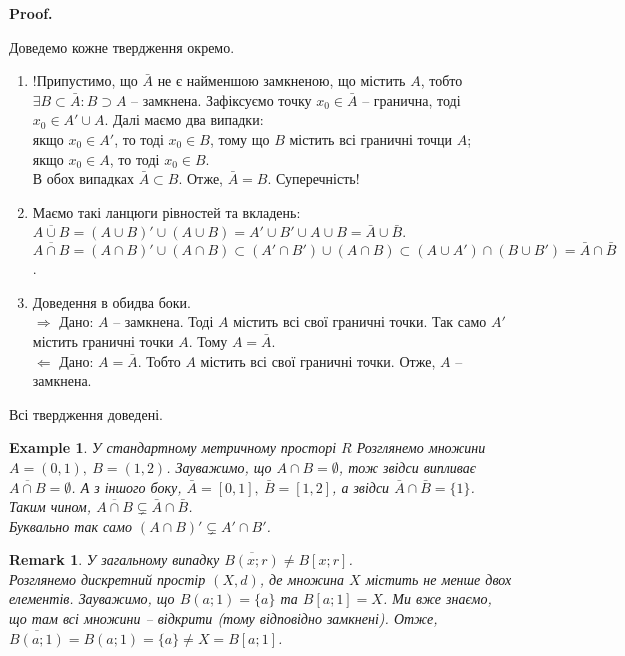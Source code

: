 \documentclass[a4paper, 10pt]{article}
\makeatletter
\def\rightproof{$\boxed{\Rightarrow}$ }
\def\leftproof{$\boxed{\Leftarrow}$ }
\theoremstyle{theoremdd}
\theoremstyle{theoremdd}
\theoremstyle{theoremdd}
\theoremstyle{theoremdd}
\newtheorem{example}[theorem]{Example}
\theoremstyle{theoremdd}
\theoremstyle{theoremdd}
\newtheorem{remark}[theorem]{Remark}
\theoremstyle{theoremdd}
\theoremstyle{theoremdd}
\renewenvironment{proof}[1][Proof.\\]{\par
\pushQED{\hfill \qed}%
\normalfont \topsep6\p@\@plus6\p@\relax
\trivlist
\item\relax
{\bfseries
#1\@addpunct{.}}\hspace\labelsep\ignorespaces
}{%
\popQED\endtrivlist\@endpefalse
}
\makeatother
\begin{document}
\begin{proof}
Доведемо кожне твердження окремо.
\begin{enumerate}[wide=0pt, label={\arabic*)}]
\item !Припустимо, що $\bar{A}$ не є найменшою замкненою, що містить $A$, тобто $\exists B \subset \bar{A}: B \supset A$ -- замкнена. Зафіксуємо точку $x_0 \in \bar{A}$ -- гранична, тоді $x_0 \in A' \cup A$. Далі маємо два випадки:\\
якщо $x_0 \in A'$, то тоді $x_0 \in B$, тому що $B$ містить всі граничні точци $A$;\\
якщо $x_0 \in A$, то тоді $x_0 \in B$.\\
В обох випадках $\bar{A} \subset B$. Отже, $\bar{A} = B$. Суперечність!

\item Маємо такі ланцюги рівностей та вкладень:\\
$\overline{A \cup B} = (A \cup B)' \cup (A \cup B) = A' \cup B' \cup A \cup B = \bar{A} \cup \bar{B}$.\\
$\overline{A \cap B} = (A \cap B)' \cup (A \cap B) \subset (A' \cap B') \cup (A \cap B) \subset (A \cup A') \cap (B \cup B') = \bar{A} \cap \bar{B}$.

\item Доведення в обидва боки.\\
\rightproof Дано: $A$ -- замкнена. Тоді $A$ містить всі свої граничні точки. Так само $A'$ містить граничні точки $A$. Тому $A = \bar{A}$.\\
\leftproof Дано: $A = \bar{A}$. Тобто $A$ містить всі свої граничні точки. Отже, $A$ -- замкнена.
\end{enumerate}
Всі твердження доведені.
\end{proof}

\begin{example}
У стандартному метричному просторі $R$ Розглянемо множини $A = (0,1),\ B = (1,2)$. Зауважимо, що $A \cap B = \emptyset$, тож звідси випливає $\overline{A \cap B} = \emptyset$. А з іншого боку, $\bar{A} = [0,1],\ \bar{B} = [1,2]$, а звідси $\bar{A} \cap \bar{B} = \{1\}$.\\
Таким чином, $\overline{A \cap B} \subsetneq \bar{A} \cap \bar{B}$.\\
Буквально так само $(A \cap B)' \subsetneq A' \cap B'$.
\end{example}

\begin{remark}
У загальному випадку $\overline{B(x;r)} \neq B[x;r]$.\\
Розглянемо дискретний простір $(X,d)$, де множина $X$ містить не менше двох елементів. Зауважимо, що $B(a;1) = \{a\}$ та $B[a;1] = X$. Ми вже знаємо, що там всі множини -- відкрити (тому відповідно замкнені). Отже, $\overline{B(a;1)} = B(a;1) = \{a\} \neq X = B[a;1]$.
\end{remark}
\end{document}
